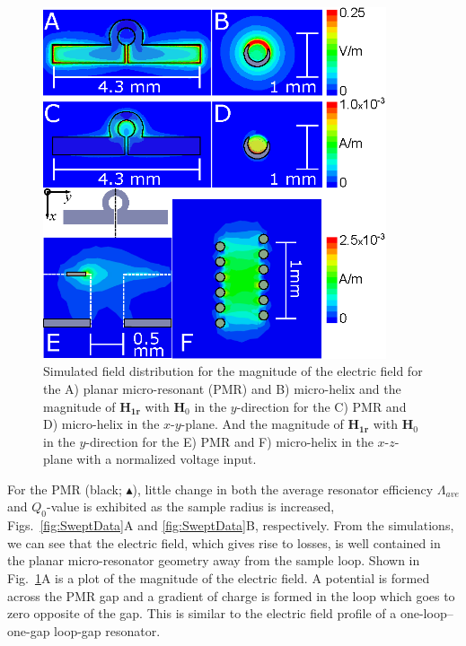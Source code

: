 \begin{figure}[htb]
 \centering
 \includegraphics[width=0.9\textwidth]{Kapitel/Ch2-Images/Ch2-AnsysFields.eps}
 \caption[Simulated field distribution for Helix and PMR.]{Simulated field distribution for the magnitude of the electric field for the A) planar micro-resonant (PMR) and B) micro-helix and the magnitude of $\mathbf{H_{1r}}$ with $\mathbf{H}_0$ in the $y$-direction for the C) PMR and D) micro-helix in the $x$-$y$-plane. And the magnitude of $\mathbf{H_{1r}}$ with $\mathbf{H}_0$ in the $y$-direction for the E) PMR and F) micro-helix in the $x$-$z$-plane with a normalized voltage input. }
 \label{ch2-fig:FieldData}
\end{figure}

For the PMR (black; $\blacktriangle$), little change in both the average resonator efficiency $\Lambda_{ave}$ and $Q_0$-value is exhibited as the sample radius is increased, Figs.~\ref{fig:SweptData}A and \ref{fig:SweptData}B, respectively. From the simulations, we can see that the electric field, which gives rise to losses, is well contained in the planar micro-resonator geometry away from the sample loop. Shown in Fig.~\ref{ch2-fig:FieldData}A is a plot of the magnitude of the electric field. A potential is formed across the PMR gap and a gradient of charge is formed in the loop which goes to zero opposite of the gap. This is similar to the electric field profile of a one-loop--one-gap loop-gap resonator.  

